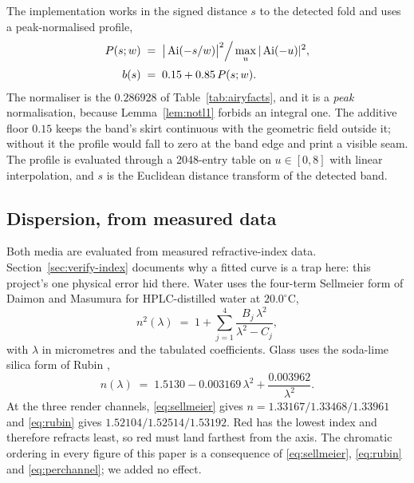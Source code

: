The implementation works in the signed distance $s$ to the detected fold and
uses a peak-normalised profile,
\begin{equation}
\begin{aligned}
P(s;w) \;&=\; \big|\operatorname{Ai}(-s/w)\big|^2 \Big/ \max_u |\operatorname{Ai}(-u)|^2 , \\[2pt]
b(s) \;&=\; 0.15 + 0.85\,P(s;w) .
\end{aligned}
\label{eq:profile}
\end{equation}
The normaliser is the $0.286928$ of Table~\ref{tab:airyfacts}, and it is a \emph{peak} normalisation, because Lemma~\ref{lem:notl1} forbids an integral one. The additive floor $0.15$ keeps the
band's skirt continuous with the geometric field outside it; without it the
profile would fall to zero at the band edge and print a visible seam. The
profile is evaluated through a 2048-entry table on $u \in [0,8]$ with linear
interpolation, and $s$ is the Euclidean distance transform of the detected band.

\subsection{Dispersion, from measured data}
\label{sec:dispersion}

Both media are evaluated from measured refractive-index data. Section~\ref{sec:verify-index} documents why a fitted curve is a trap here: this project's one physical error hid there.
Water uses the four-term Sellmeier form of Daimon and Masumura
\cite{daimon2007} for HPLC-distilled water at $20.0^\circ\text{C}$,
\begin{equation}
n^2(\lambda) \;=\; 1 + \sum_{j=1}^{4} \frac{B_j\,\lambda^2}{\lambda^2 - C_j},
\label{eq:sellmeier}
\end{equation}
with $\lambda$ in micrometres and the tabulated coefficients. Glass uses the
soda-lime silica form of Rubin \cite{rubin1985},
\begin{equation}
n(\lambda) \;=\; 1.5130 - 0.003169\,\lambda^2 + \frac{0.003962}{\lambda^2}.
\label{eq:rubin}
\end{equation}
At the three render channels, \eqref{eq:sellmeier} gives
$n = 1.33167 / 1.33468 / 1.33961$ and \eqref{eq:rubin} gives
$1.52104 / 1.52514 / 1.53192$. Red has the lowest index and therefore refracts
least, so red must land farthest from the axis. The chromatic ordering in every
figure of this paper is a consequence of \eqref{eq:sellmeier}, \eqref{eq:rubin} and \eqref{eq:perchannel}; we added no effect.


